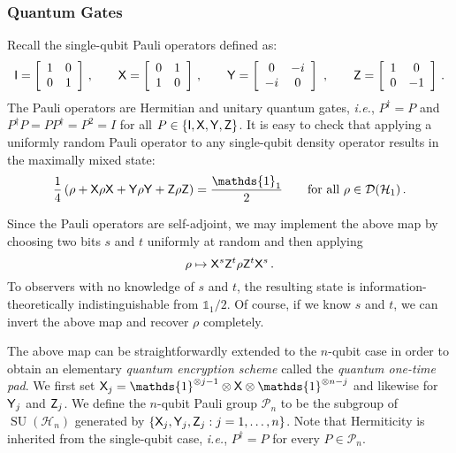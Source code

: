 \subsubsection{Quantum Gates}
Recall  the single-qubit Pauli operators  defined as:
$$
{\sf I} = \left[\begin{array}{cc} 1 & 0\\ 0 & 1\end{array}\right]\,,
\qquad
{\sf X} = \left[\begin{array}{cc} 0 & 1\\ 1 & 0\end{array}\right]\,,
\qquad
{\sf Y} = \left[\begin{array}{cc} 0 & -i\\ -i & 0\end{array}\right]\,\,,
\qquad
{\sf Z} = \left[\begin{array}{cc} 1 & 0\\ 0 & -1\end{array}\right]\,.
$$
The Pauli operators are Hermitian and unitary quantum gates, \emph{i.e.}, $P^\dag=P$ and $P^\dag P=P P^\dag = P^2 = I$ for all $P \in \{{\sf I}, {\sf X}, {\sf Y}, {\sf Z}\}$. It is easy to check that applying a uniformly random Pauli operator to any single-qubit density operator results in the maximally mixed state:
$$
\frac{1}{4}\left(\rho +  \xgate\rho  \xgate + \ygate\rho \ygate + \zgate\rho \zgate \right) = \frac{\mathds{1}_1}{2}
\qquad
\text{for all }
\rho \in \mathcal{D} (\mathcal{H}_1)\,.
$$

Since the Pauli operators are self-adjoint, we may implement the above map by choosing two bits $s$ and $t$ uniformly at random and then applying
$$
\rho \mapsto {\sf X}^s {\sf Z}^t \rho {\sf Z}^t {\sf X}^s\,.
$$
To observers with no knowledge of $s$ and $t$, the resulting state is information-theoretically indistinguishable from $\mathds{1}_1/2$. Of course, if we know $s$ and $t$, we can invert the above map and recover $\rho$ completely.


The above map can be straightforwardly extended to the $n$-qubit case in order to obtain an elementary {\em quantum encryption scheme} called the {\em quantum one-time pad}\cite{AMTW00}.
We first set $\xgate_j = \mathds{1}^{\otimes j-1} \otimes \xgate \otimes \mathds{1}^{\otimes n-j}$ and likewise for ${\sf Y}_j$ and ${\sf Z}_j$. We define the $n$-qubit Pauli group $\mathcal P_n$ to be the subgroup of $\operatorname{SU}(\mathcal{H}_n)$ generated by $\{{\sf X}_j, {\sf Y}_j, {\sf Z}_j : j = 1, \dots, n \}$. Note that Hermiticity is inherited from the single-qubit case, \emph{i.e.}, $P^\dag = P$ for every $P \in \mathcal{P}_n$.

